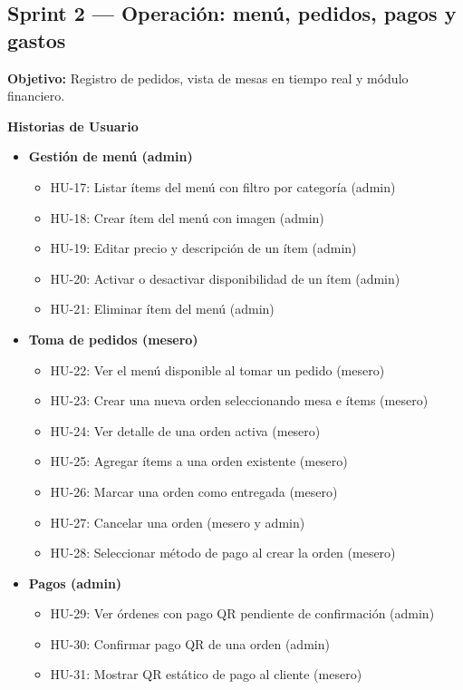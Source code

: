\subsection*{Sprint 2 — Operación: menú, pedidos, pagos y gastos}

\textbf{Objetivo:}
Registro de pedidos, vista de mesas en tiempo real y módulo financiero.

\textbf{Historias de Usuario}

\begin{itemize}[leftmargin=1.5em]

\item \textbf{Gestión de menú (admin)}

\begin{itemize}
\item HU-17: Listar ítems del menú con filtro por categoría (admin)
\item HU-18: Crear ítem del menú con imagen (admin)
\item HU-19: Editar precio y descripción de un ítem (admin)
\item HU-20: Activar o desactivar disponibilidad de un ítem (admin)
\item HU-21: Eliminar ítem del menú (admin)
\end{itemize}

\item \textbf{Toma de pedidos (mesero)}

\begin{itemize}
\item HU-22: Ver el menú disponible al tomar un pedido (mesero)
\item HU-23: Crear una nueva orden seleccionando mesa e ítems (mesero)
\item HU-24: Ver detalle de una orden activa (mesero)
\item HU-25: Agregar ítems a una orden existente (mesero)
\item HU-26: Marcar una orden como entregada (mesero)
\item HU-27: Cancelar una orden (mesero y admin)
\item HU-28: Seleccionar método de pago al crear la orden (mesero)
\end{itemize}

\item \textbf{Pagos (admin)}

\begin{itemize}
\item HU-29: Ver órdenes con pago QR pendiente de confirmación (admin)
\item HU-30: Confirmar pago QR de una orden (admin)
\item HU-31: Mostrar QR estático de pago al cliente (mesero)
\end{itemize}


\end{itemize}
